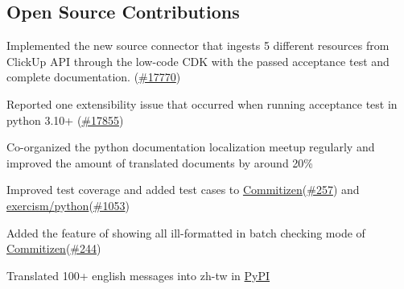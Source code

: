 \subsection{{Open Source Contributions}}
\begin{zitemize}
\item Implemented the new source connector that ingests 5 different resources from ClickUp API through the low-code CDK with the passed acceptance test and complete documentation. (\href{https://github.com/airbytehq/airbyte/pull/17770}{\#17770})
\item Reported one extensibility issue that occurred when running acceptance test in python 3.10+ (\href{https://github.com/airbytehq/airbyte/issues/17855}{\#17855})
\end{zitemize}
\begin{zitemize}
\item Co-organized the python documentation localization meetup regularly and improved the amount of translated documents by around 20\%
\end{zitemize}
\begin{zitemize}
  \item Improved test coverage and added test cases to \href{https://commitizen-tools.github.io/commitizen/}{Commitizen}(\href{https://github.com/commitizen-tools/commitizen/pull/257}{\#257}) and \href{https://exercism.org/tracks/python}{exercism/python}(\href{https://github.com/exercism/python/pull/1053}{\#1053})
  \item Added the feature of showing all ill-formatted in batch checking mode of \href{https://commitizen-tools.github.io/commitizen/}{Commitizen}(\href{https://github.com/commitizen-tools/commitizen/pull/244}{\#244})
  \item Translated 100+ english messages into zh-tw in \href{https://pypi.org}{PyPI}
\end{zitemize}